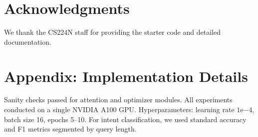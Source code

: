 \documentclass{article}
\begin{document}
\section*{Acknowledgments}
We thank the CS224N staff for providing the starter code and detailed documentation.

\appendix
\section{Appendix: Implementation Details}
Sanity checks passed for attention and optimizer modules. All experiments conducted on a single NVIDIA A100 GPU. Hyperparameters: learning rate $1\mathrm{e}{-4}$, batch size 16, epochs 5--10. For intent classification, we used standard accuracy and F1 metrics segmented by query length.
\end{document}
